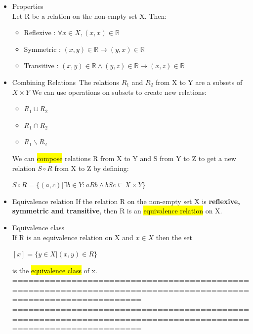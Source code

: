 \documentclass{article}
\begin{document}
\begin{itemize}
\item  Properties\\
Let R be a relation on the non-empty set X. Then:
\begin{itemize}
\item Reflexive :  $\forall x \in X , (x,x) \in \mathbb{R}$
\item Symmetric : $(x,y) \in \mathbb{R}  \rightarrow (y,x) \in \mathbb{R}$
\item Transitive : $(x,y) \in \mathbb{R} \land (y,z) \in \mathbb{R} \rightarrow (x,z) \in \mathbb{R}$ 
\end{itemize}

\item Combining Relations\
The relations $R_1$ and $R_2$ from X to Y are a subsets of $ X \times Y $
We can use operations on subsets to create new relations:
\begin{itemize}
\item $R_1 \cup R_2$
\item $R_1 \cap R_2$
\item $R_1 \backslash R_2$
\end{itemize}

We can \hl{compose} relations R from X to Y and S from Y to Z to get a
new relation $S \circ R$ from X to Z by defining:
\begin{center}
$S \circ R = \{(a,c) | \exists b \in Y : aRb \land bSc \subseteq X \times Y\}$
\end{center}

\item Equivalence relation
If the relation R on the non-empty set X is \textbf{reflexive, symmetric and
transitive}, then R is an \hl{equivalence relation} on X.

\item Equivalence class\\
If R is an equivalence relation on X and $x \in X$ then the set
\begin{center}
$[x] = \{y \in X | (x,y) \in R\}$
\end{center}
is the \hl{equivalence class} of x.\\

================================================================================================================
\newpage
================================================================================================================\\


\end{itemize}
\end{document}
